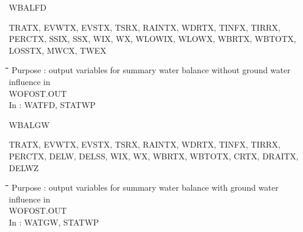 \documentclass[11pt]{article}
\begin{document}
\bigskip
WBALFD
\testlastline

\begin{indenting}{2.54cm}
TRATX, EVWTX, EVSTX, TSRX, RAINTX, WDRTX, TINFX, TIRRX, PERCTX, SSIX, SSX,
WIX, WX, WLOWIX, WLOWX, WBRTX, WBTOTX, LOSSTX, MWCX, TWEX
\end{indenting}
\begin{tabbing}
\hspace{1.27cm}\=\hspace{1.27cm}\=\hspace{1.27cm}\=\hspace{1.27cm}\=%
\hspace{1.27cm}\=\hspace{1.27cm}\=\hspace{1.27cm}\=\hspace{1.27cm}\=%
\hspace{1.27cm}\=\hspace{1.27cm}\=\kill
\>\> Purpose : output variables for summary water balance without ground water influence in\\
 \>\> \>   WOFOST.OUT\\
\>\> In\> : WATFD, STATWP
\end{tabbing}

\bigskip
WBALGW
\testlastline

\begin{indenting}{2.54cm}
TRATX, EVWTX, EVSTX, TSRX, RAINTX, WDRTX, TINFX, TIRRX, PERCTX, DELW, DELSS,
WIX, WX, WBRTX, WBTOTX, CRTX, DRAITX, DELWZ
\end{indenting}
\begin{tabbing}
\hspace{1.27cm}\=\hspace{1.27cm}\=\hspace{1.27cm}\=\hspace{1.27cm}\=%
\hspace{1.27cm}\=\hspace{1.27cm}\=\hspace{1.27cm}\=\hspace{1.27cm}\=%
\hspace{1.27cm}\=\hspace{1.27cm}\=\kill
\>\> Purpose : output variables for summary water balance with ground water influence in\\
 \>\> \>   WOFOST.OUT\\
\>\> In\> : WATGW, STATWP
\end{tabbing}
\end{document}
